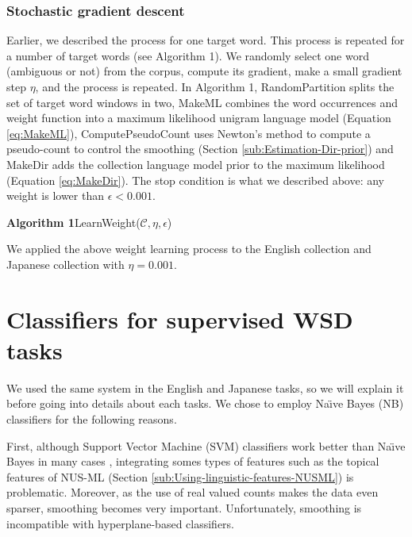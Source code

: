 \documentclass[english]{jnlp_1.4}
\begin{document}
\subsubsection{Stochastic gradient descent}

Earlier, we described the process for one target word. This process
is repeated for a number of target words 
    (see Algorithm 1).
We randomly select one word (ambiguous or not) from the corpus, compute
its gradient, make a small gradient step $\eta$, and the process
is repeated. 
    In Algorithm 1, 
RandomPartition splits the
set of target word windows in two, MakeML combines the word occurrences
and weight function into a maximum likelihood unigram language model
(Equation \ref{eq:MakeML}), ComputePseudoCount uses Newton's method
to compute a pseudo-count to control the smoothing (Section \ref{sub:Estimation-Dir-prior})
and MakeDir adds the collection language model prior to the maximum
likelihood (Equation \ref{eq:MakeDir}). The stop condition is what
we described above: any weight is lower than $\epsilon<0.001$.

    \begin{table}[t]
    \begin{center}
    \textbf{Algorithm 1}\hspace{1zw}LearnWeight($\mathcal{C},\eta,\epsilon$)
    \par\vspace{1zw}

    \end{center}
    \end{table}
    \setcounter{table}{0}


We applied the above weight learning process to the English collection
and Japanese collection with $\eta=0.001$. 


\section{Classifiers for supervised WSD tasks}
\label{sec:Classifiers-for-supervised}

We used the same system in the English and Japanese tasks, so we will
explain it before going into details about each tasks. We chose to
employ Na\"{\i}ve Bayes (NB) classifiers for the following reasons.

First, although Support Vector Machine (SVM) classifiers work better
than Na\"{\i}ve Bayes in many cases \cite{LeeNg2002WSD}, integrating
somes types of features such as the topical features of NUS-ML (Section
\ref{sub:Using-linguistic-features-NUSML}) is problematic. Moreover,
as the use of real valued counts makes the data even sparser, smoothing
becomes very important. Unfortunately, smoothing is incompatible with
hyperplane-based classifiers.
\end{document}
